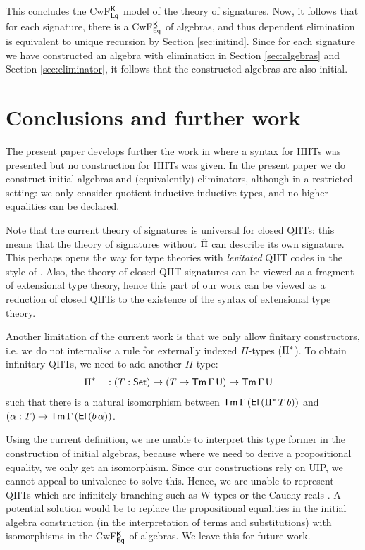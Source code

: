 \documentclass[acmsmall,review,anonymous]{acmart}\settopmatter{printfolios=true,printccs=false,printacmref=false}
\begin{document}
This concludes the CwF$^{\mathsf{K}}_{\mathsf{Eq}}$ model of the theory of
signatures. Now, it follows that for each signature, there is a
CwF$^{\mathsf{K}}_{\mathsf{Eq}}$ of algebras, and thus dependent elimination is
equivalent to unique recursion by Section \ref{sec:initind}. Since for
each signature we have constructed an algebra with elimination in
Section \ref{sec:algebras} and Section \ref{sec:eliminator}, it follows
that the constructed algebras are also initial.



\section{Conclusions and further work}
\label{sec:conclusions}

The present paper develops further the work in
\cite{kaposi_et_al:LIPIcs:2018:9190} where a syntax for HIITs was
presented but no construction for HIITs was given. In the present
paper we do construct initial algebras and (equivalently) eliminators,
although in a restricted setting: we only consider quotient
inductive-inductive types, and no higher equalities can be declared.

Note that the current theory of signatures is universal for closed
QIITs: this means that the theory of signatures without $\hat{\Pi}$ can
describe its own signature. This perhaps opens the way for type
theories with \emph{levitated} QIIT codes in the style of
\cite{chapman2010gentle}. Also, the theory of closed QIIT signatures
can be viewed as a fragment of extensional type theory, hence this
part of our work can be viewed as a reduction of closed QIITs to the
existence of the syntax of extensional type theory.

Another limitation of the current work is that we only allow finitary
constructors, i.e. we do not internalise a rule for externally
indexed $\Pi$-types (${\Pi}^*$). To obtain infinitary QIITs, we need to
add another $\Pi$-type:
\begin{alignat*}{5}
  & \Pii && : (T:\Set)\ra(T\ra\Tm\,\Gamma\,\U)\ra\Tm\,\Gamma\,\U %
\end{alignat*}
such that there is a natural isomorphism between
$\mathsf{Tm}\,\Gamma\,(\mathsf{El}\,({\Pi}^*\,T\,b))$ and $(\alpha:T) \rightarrow
\mathsf{Tm}\,\Gamma\,(\mathsf{El}\,(b\,\alpha))$.

Using the current definition, we are unable to interpret this type
former in the construction of initial algebras, because where we need
to derive a propositional equality, we only get an isomorphism. Since
our constructions rely on UIP, we cannot appeal to univalence to solve
this. Hence, we are unable to represent QIITs which are infinitely
branching such as W-types or the Cauchy reals \cite{HoTTbook}. A
potential solution would be to replace the propositional equalities in
the initial algebra construction (in the interpretation of terms and
substitutions) with isomorphisms in the CwF$^{\mathsf{K}}_{\mathsf{Eq}}$ of
algebras. We leave this for future work.
\end{document}
